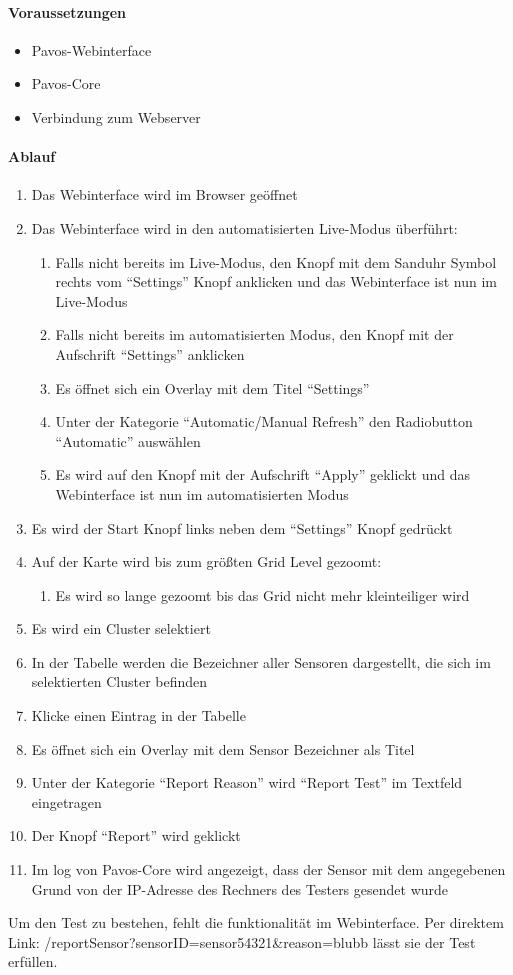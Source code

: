 \paragraph{Voraussetzungen}
\begin{itemize}
\item Pavos-Webinterface
\item Pavos-Core
\item Verbindung zum Webserver
\end{itemize}
\paragraph{Ablauf}
\begin{enumerate}
\item Das Webinterface wird im Browser geöffnet
\item Das Webinterface wird in den automatisierten Live-Modus überführt:
\begin{enumerate}
\item Falls nicht bereits im Live-Modus, den Knopf mit dem Sanduhr Symbol rechts vom ``Settings'' Knopf anklicken und das Webinterface ist nun im Live-Modus
\item Falls nicht bereits im automatisierten Modus, den Knopf mit der Aufschrift ``Settings'' anklicken
\item Es öffnet sich ein Overlay mit dem Titel ``Settings''
\item Unter der Kategorie ``Automatic/Manual Refresh'' den Radiobutton ``Automatic'' auswählen
\item Es wird auf den Knopf mit der Aufschrift ``Apply'' geklickt und das Webinterface ist nun im automatisierten Modus
\end{enumerate} 
\item Es wird der Start Knopf links neben dem ``Settings'' Knopf gedrückt
\item Auf der Karte wird bis zum größten Grid Level gezoomt:
\begin{enumerate}
\item Es wird so lange gezoomt bis das Grid nicht mehr kleinteiliger wird
\end{enumerate}
\item Es wird ein Cluster selektiert
\item In der Tabelle werden die Bezeichner aller Sensoren dargestellt, die sich im selektierten Cluster befinden
\item Klicke einen Eintrag in der Tabelle
\item Es öffnet sich ein Overlay mit dem Sensor Bezeichner als Titel
\item Unter der Kategorie ``Report Reason'' wird ``Report Test'' im Textfeld eingetragen
\item Der Knopf ``Report'' wird geklickt
\item Im log von Pavos-Core wird angezeigt, dass der Sensor mit dem angegebenen Grund von der IP-Adresse des Rechners des Testers gesendet wurde
\end{enumerate}
\szenarioBad
Um den Test zu bestehen, fehlt die funktionalität im Webinterface.
Per direktem Link: /reportSensor?sensorID=sensor54321&reason=blubb lässt sie der Test erfüllen.

